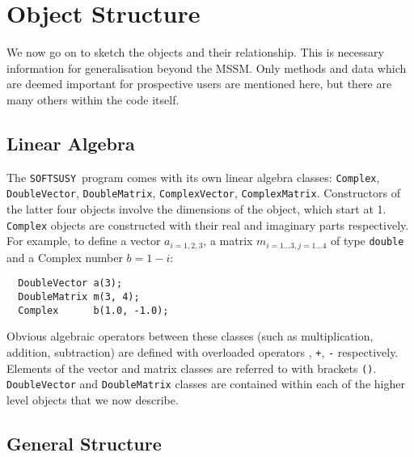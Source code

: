 \documentclass[]{article}
\def\SOFTSUSY{{\tt SOFTSUSY}}
\def\code#1{\small{\tt #1}\normalsize}
\begin{document}
\section{Object Structure\label{sec:objects}}

We now go on to sketch the objects and their relationship. This is necessary
information for generalisation beyond the MSSM\@.
Only methods and data which are deemed important for prospective users are
mentioned here, but there are many others within the code itself.

\subsection{Linear Algebra}

The \SOFTSUSY~program comes with its own linear algebra classes: 
\code{Complex}, \code{DoubleVector}, \code{DoubleMatrix},
\code{ComplexVector}, \code{ComplexMatrix}. 
Constructors of the latter four objects involve the dimensions of the object,
which start 
at 1. \code{Complex} objects are constructed with their real and imaginary
parts respectively.
For example, to define a vector $a_{i=1,2,3}$, a matrix $m_{i=1\ldots3,
j=1\ldots 4}$ of type \code{double} and a Complex number $b=1-i$:
\small
\begin{verbatim}
  DoubleVector a(3);
  DoubleMatrix m(3, 4);
  Complex      b(1.0, -1.0); 
\end{verbatim}
\normalsize
Obvious algebraic operators between these classes (such as
multiplication, addition, subtraction) are defined with overloaded
operators \code{*}, \code{+}, \code{-} respectively. Elements of the vector
and matrix classes are referred to with 
brackets \code{()}. \code{DoubleVector} and \code{DoubleMatrix} classes are
contained within each of the higher level objects that we now describe. 

\subsection{General Structure}
\end{document}
